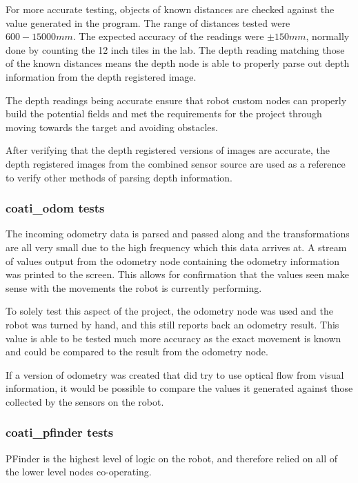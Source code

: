 \documentclass{article}[12]
\begin{document}
	For more accurate testing, objects of known distances are checked against the value generated in the program. The range of distances tested were $600-15000mm$. The expected accuracy of the readings were $\pm 150mm$, normally done by counting the 12 inch tiles in the lab. The depth reading matching those of the known distances means the depth node is able to properly parse out depth information from the depth registered image.

	The depth readings being accurate ensure that robot custom nodes can properly build the potential fields and met the requirements for the project through moving towards the target and avoiding obstacles. 

	After verifying that the depth registered versions of images are accurate, the depth registered images from the combined sensor source are used as a reference to verify other methods of parsing depth information.
	
	\subsubsection{coati\_odom tests}
	
	The incoming odometry data is parsed and passed along and the transformations are all very small due to the high frequency which this data arrives at. A stream of values output from the odometry node containing the odometry information was printed to the screen. This allows for confirmation that the values seen make sense with the movements the robot is currently performing. 
	
	To solely test this aspect of the project, the odometry node was used and the robot was turned by hand, and this still reports back an odometry result. This value is able to be tested much more accuracy as the exact movement is known and could be compared to the result from the odometry node. 

	If a version of odometry was created that did try to use optical flow from visual information, it would be possible to compare the values it generated against those collected by the sensors on the robot.
	
	\subsubsection{coati\_pfinder tests}
	
	PFinder is the highest level of logic on the robot, and therefore relied on all of the lower level nodes co-operating. 
	
\end{document}
